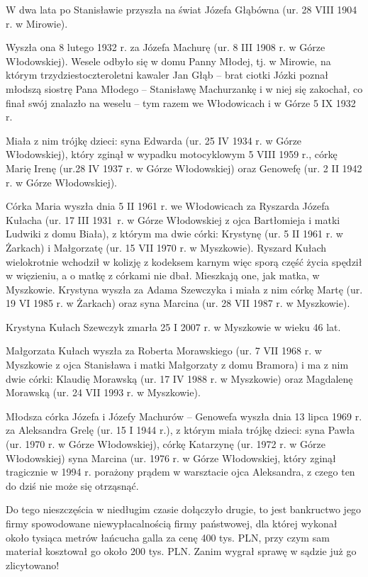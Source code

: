 W dwa lata po Stanisławie przyszła na świat Józefa Głąbówna (ur. 28 VIII 1904 r. w Mirowie).


Wyszła ona 8 lutego 1932 r. za Józefa Machurę (ur. 8 III 1908 r. w Górze Włodowskiej). Wesele odbyło się w domu Panny Młodej, tj. w Mirowie, na którym trzydziestoczteroletni kawaler Jan Głąb -- brat ciotki Józki poznał młodszą siostrę Pana Młodego -- Stanisławę Machurzankę i w niej się zakochał, co finał swój znalazło na weselu -- tym razem we Włodowicach i w Górze 5 IX 1932 r.


Miała z nim trójkę dzieci: syna Edwarda (ur. 25 IV 1934 r. w Górze Włodowskiej), który zginął w wypadku motocyklowym 5 VIII 1959 r., córkę Marię Irenę (ur.28 IV 1937 r. w Górze Włodowskiej) oraz Genowefę (ur. 2 II 1942 r. w Górze Włodowskiej).


Córka Maria wyszła dnia 5 II 1961 r. we Włodowicach za Ryszarda Józefa Kułacha (ur. 17 III 1931~r. w Górze Włodowskiej z ojca Bartłomieja i matki Ludwiki z domu Biała), z którym ma dwie córki: Krystynę (ur. 5 II 1961 r. w Żarkach) i Małgorzatę (ur. 15 VII 1970 r. w Myszkowie). Ryszard Kułach wielokrotnie wchodził w kolizję z kodeksem karnym więc sporą część życia spędził w więzieniu, a o matkę z córkami nie dbał. Mieszkają one, jak matka, w Myszkowie. Krystyna wyszła za Adama Szewczyka 
i miała z nim córkę Martę (ur. 19 VI 1985 r. w Żarkach) oraz syna Marcina (ur. 28 VII 1987 r. w Myszkowie).


Krystyna Kułach Szewczyk zmarła 25 I 2007 r. w Myszkowie w wieku 46 lat.


Małgorzata Kułach wyszła za Roberta Morawskiego (ur. 7 VII 1968 r. w Myszkowie z ojca Stanisława i matki Małgorzaty z domu Bramora) i ma z nim dwie córki: Klaudię Morawską (ur. 17 IV 1988 r. w Myszkowie) oraz Magdalenę Morawską (ur. 24 VII 1993 r. w Myszkowie). 

Młodsza  córka Józefa i Józefy Machurów -- Genowefa wyszła dnia 13 lipca 1969 r. za Aleksandra Grelę (ur. 15 I 1944 r.), z którym miała trójkę dzieci: syna Pawła (ur. 1970 r. w Górze Włodowskiej), córkę Katarzynę (ur. 1972 r. w Górze Włodowskiej) syna Marcina (ur. 1976 r. w Górze Włodowskiej, który zginął tragicznie w 1994 r. porażony prądem w warsztacie ojca Aleksandra, z czego ten do dziś nie może się otrząsnąć.


Do tego nieszczęścia w niedługim czasie dołączyło drugie, to jest bankructwo jego firmy spowodowane niewypłacalnością firmy państwowej, dla której wykonał około tysiąca metrów łańcucha galla za cenę 400 tys. PLN, przy czym sam materiał kosztował go około 200 tys. PLN. Zanim wygrał sprawę w sądzie już go zlicytowano!
